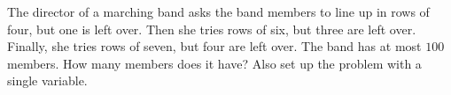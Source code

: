 The director of a marching band asks the band members to line up in rows of four, but one is left over. Then she tries rows of six, but three are left over. Finally, she tries rows of seven, but four are left over. The band has at most $100$ members. How many members does it have? Also set up the problem with a single variable.
